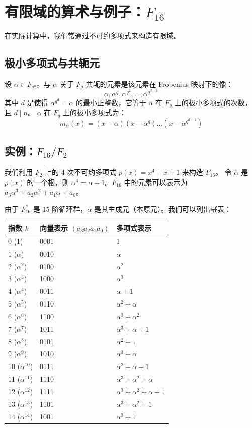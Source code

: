 \documentclass[11pt]{article}
\begin{document}
\section{有限域的算术与例子：$F_{16}$}

在实际计算中，我们常通过不可约多项式来构造有限域。

\subsection{极小多项式与共轭元}
设 $\alpha \in F_{q^n}$。与 $\alpha$ 关于 $F_q$ 共轭的元素是该元素在 Frobenius 映射下的像：
\[ \alpha, \alpha^q, \alpha^{q^2}, \dots, \alpha^{q^{d-1}} \]
其中 $d$ 是使得 $\alpha^{q^d} = \alpha$ 的最小正整数，它等于 $\alpha$ 在 $F_q$ 上的极小多项式的次数，且 $d \mid n$。
$\alpha$ 在 $F_q$ 上的极小多项式为：
\[ m_\alpha(x) = (x - \alpha)(x - \alpha^q) \dots (x - \alpha^{q^{d-1}}) \]

\subsection{实例：$F_{16} / F_2$}
我们利用 $F_2$ 上的 4 次不可约多项式 $p(x) = x^4 + x + 1$ 来构造 $F_{16}$。
令 $\alpha$ 是 $p(x)$ 的一个根，则 $\alpha^4 = \alpha + 1$。$F_{16}$ 中的元素可以表示为 $a_3 \alpha^3 + a_2 \alpha^2 + a_1 \alpha + a_0$。

由于 $F_{16}^*$ 是 15 阶循环群，$\alpha$ 是其生成元（本原元）。我们可以列出幂表：

\begin{table}[h]
\centering
\begin{tabular}{|l|l|l|}
\hline
指数 $k$ & 向量表示 $(a_3 a_2 a_1 a_0)$ & 多项式表示 \\ \hline
0 (1)      & 0001 & 1 \\ \hline
1 ($\alpha$) & 0010 & $\alpha$ \\ \hline
2 ($\alpha^2$) & 0100 & $\alpha^2$ \\ \hline
3 ($\alpha^3$) & 1000 & $\alpha^3$ \\ \hline
4 ($\alpha^4$) & 0011 & $\alpha + 1$ \\ \hline
5 ($\alpha^5$) & 0110 & $\alpha^2 + \alpha$ \\ \hline
6 ($\alpha^6$) & 1100 & $\alpha^3 + \alpha^2$ \\ \hline
7 ($\alpha^7$) & 1011 & $\alpha^3 + \alpha + 1$ \\ \hline
8 ($\alpha^8$) & 0101 & $\alpha^2 + 1$ \\ \hline
9 ($\alpha^9$) & 1010 & $\alpha^3 + \alpha$ \\ \hline
10 ($\alpha^{10}$) & 0111 & $\alpha^2 + \alpha + 1$ \\ \hline
11 ($\alpha^{11}$) & 1110 & $\alpha^3 + \alpha^2 + \alpha$ \\ \hline
12 ($\alpha^{12}$) & 1111 & $\alpha^3 + \alpha^2 + \alpha + 1$ \\ \hline
13 ($\alpha^{13}$) & 1101 & $\alpha^3 + \alpha^2 + 1$ \\ \hline
14 ($\alpha^{14}$) & 1001 & $\alpha^3 + 1$ \\ \hline
\end{tabular}
\end{table}
\end{document}
